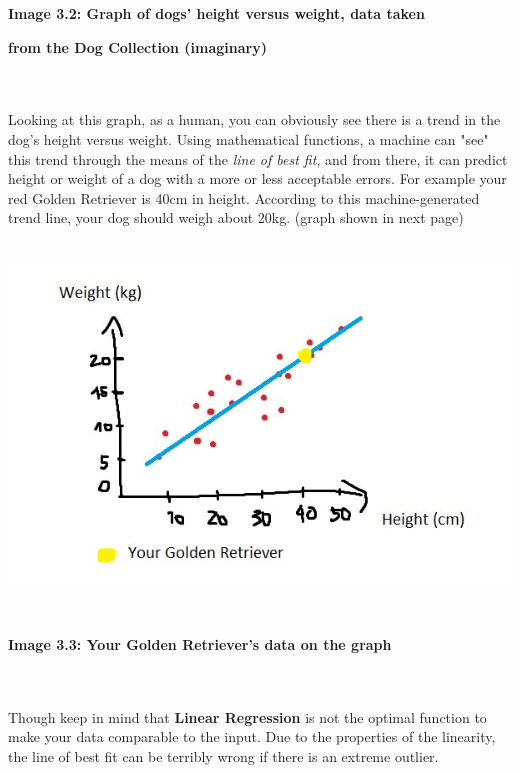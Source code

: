 \documentclass{article}
\begin{document}
	\centerline{\small{\textbf{Image 3.2: Graph of dogs' height versus weight, data taken}}}	
	\centerline{\small{\textbf{ from the Dog Collection (imaginary)}}}\\\\
	\tab\tab Looking at this graph, as a human, you can obviously see there is a trend in the dog's height versus weight. Using mathematical functions, a machine can "see" this trend through the means of the \textit{line of best fit}, and from there, it can predict height or weight of a dog with a more or less acceptable errors. For example your red Golden Retriever is 40cm in height. According to this machine-generated trend line, your dog should weigh about 20kg. (graph shown in next page) \\\\
	\centerline{\includegraphics[scale=0.5]{img5}}	\\
	\centerline{\small{\textbf{Image 3.3: Your Golden Retriever's data on the graph}}}\\\\
	\tab\tab Though keep in mind that \textbf{Linear Regression} is not the optimal function to make your data comparable to the input. Due to the properties of the linearity, the line of best fit can be terribly wrong if there is an extreme outlier.\\
\end{document}
